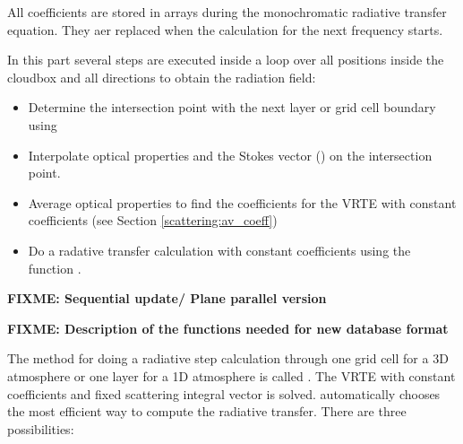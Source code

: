 All coefficients are stored in arrays during the monochromatic
radiative transfer equation. They aer replaced when the calculation
for the next frequency starts.


In this part several steps are executed inside a loop over all
positions inside the cloudbox and all directions to obtain the
radiation field:
\begin{itemize}
\item Determine the intersection point with the next layer or grid
  cell boundary using 
\item Interpolate optical properties and the Stokes vector
  () on the intersection point.
\item Average optical properties to find the coefficients for the VRTE
  with constant coefficients (see Section \ref{scattering:av_coeff})
\item Do a radative transfer calculation with constant coefficients
  using the function .
\end{itemize}

{\bf FIXME: Sequential update/ Plane parallel version}




\label{sec:scattering:single_scat_prop}

{\bf FIXME: Description of the functions needed for new database format}


\label{sec:scattering:rte_step}
The method for doing a radiative step calculation through one grid
cell for a 3D atmosphere or one layer for a 1D atmosphere is called
. The VRTE with constant coefficients and fixed
scattering integral vector is solved.  
automatically chooses the most efficient way to compute the radiative
transfer. There are three possibilities:

